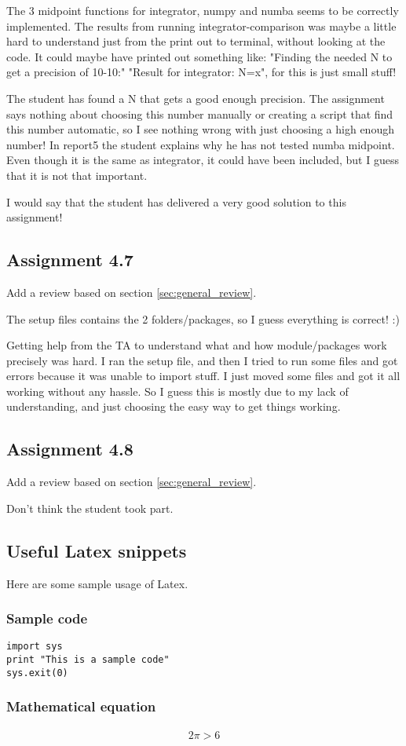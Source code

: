 \documentclass[a4paper]{article}
\begin{document}
The 3 midpoint functions for integrator, numpy and numba seems to be correctly implemented. The results from running integrator-comparison was maybe a little hard to understand just from the print out to terminal, without looking at the code. It could maybe have printed out something like: "Finding the needed N to get a precision of 10-10:" "Result for integrator: N=x", for this is just small stuff!

The student has found a N that gets a good enough precision. The assignment says nothing about choosing this number manually or creating a script that find this number automatic, so I see nothing wrong with just choosing a high enough number!
In report5 the student explains why he has not tested numba midpoint. Even though it is the same as integrator, it could have been included, but I guess that it is not that important.

I would say that the student has delivered  a very good solution to this assignment!


\subsection*{Assignment 4.7}
Add a review based on section \ref{sec:general_review}.

The setup files contains the 2 folders/packages, so I guess everything is correct! :)

Getting help from the TA to understand what and how module/packages work precisely was hard. I ran the setup file, and then I tried to run some files and got errors because it was unable to import stuff. I just moved some files and got it all working without any hassle. So I guess this is mostly due to my lack of understanding, and just choosing the easy way to get things working.


\subsection*{Assignment 4.8}
Add a review based on section \ref{sec:general_review}.

Don't think the student took part.

\subsection{Useful Latex snippets}
Here are some sample usage of Latex.

\subsubsection{Sample code}
\begin{verbatim}
import sys
print "This is a sample code"
sys.exit(0)
\end{verbatim}

\subsubsection{Mathematical equation}
\begin{align}
2 \pi > 6
\end{align}





\end{document}
